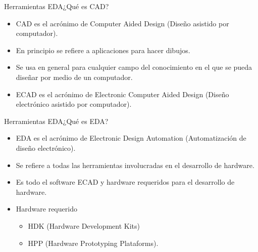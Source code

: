 \documentclass{beamer}
\begin{document}
\begin{frame}{Herramientas EDA}{¿Qué es CAD?}
  \begin{itemize}
  \item CAD es el acrónimo de Computer Aided Design (Diseño asistido por computador).
  \item En principio se refiere a aplicaciones para hacer dibujos.
  \item Se usa en general para cualquier campo del conocimiento en el que se pueda diseñar por medio de un computador.
  \item ECAD es el acrónimo de Electronic Computer Aided Design (Diseño electrónico asistido por computador).
  \end{itemize}
\end{frame}

\begin{frame}{Herramientas EDA}{¿Qué es EDA?}
  \begin{itemize}
  \item EDA es el acrónimo de Electronic Design Automation (Automatización de diseño electrónico).
  \item Se refiere a todas las herramientas involucradas en el desarrollo de hardware.
  \item Es todo el software ECAD y hardware requeridos para el desarrollo de hardware.
  \item Hardware requerido
    \begin{itemize}
    \item HDK (Hardware Development Kits)
    \item HPP (Hardware Prototyping Plataforms).
    \end{itemize}
  \end{itemize}
\end{frame}
\end{document}
